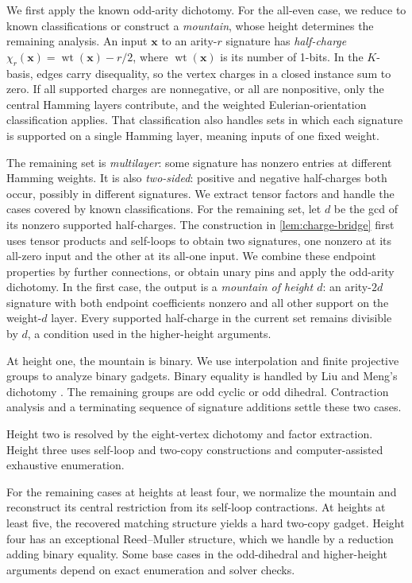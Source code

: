 \documentclass[11pt,letterpaper,onecolumn]{article}
\theoremstyle{plain}
\theoremstyle{definition}
\theoremstyle{remark}
\newcommand{\wt}{\operatorname{wt}}
\begin{document}
We first apply the known odd-arity dichotomy.  For the all-even case,
we reduce to known classifications or construct a \emph{mountain}, whose
height determines the remaining analysis.
An input \({\mathbf x}\) to an arity-\(r\) signature has \emph{half-charge}
\(\chi_r({\mathbf x})=\wt({\mathbf x})-r/2\), where \(\wt({\mathbf x})\) is its number of 1-bits.
In the \(K\)-basis, edges carry disequality, so the vertex charges in a
closed instance sum to zero.  If all supported charges are nonnegative,
or all are nonpositive, only the central Hamming layers contribute, and
the weighted Eulerian-orientation classification applies.  That
classification also handles sets in which each signature is supported on
a single Hamming layer, meaning inputs of one fixed weight.

The remaining set is \emph{multilayer}: some signature has nonzero entries at
different Hamming weights.  It is also \emph{two-sided}: positive and
negative half-charges both occur, possibly in different signatures.
We extract tensor factors and handle the cases covered by known
classifications.  For the remaining set, let \(d\) be the gcd of its
nonzero supported half-charges.  The construction in \cref{lem:charge-bridge}
first uses tensor
products and self-loops to obtain two signatures, one nonzero at its
all-zero input and the other at its all-one input.  We combine these
endpoint properties by further connections, or obtain unary pins and
apply the odd-arity dichotomy.  In the first case, the output is a
\emph{mountain of height \(d\)}: an arity-\(2d\) signature with both
endpoint coefficients nonzero and all other support on the weight-\(d\)
layer.  Every supported half-charge in the current set remains divisible
by \(d\), a condition used in the higher-height arguments.

At height one, the mountain is binary.  We use interpolation and finite
projective groups to analyze binary gadgets.  Binary equality is handled
by Liu and Meng's dichotomy \cite[Theorem~1.2]{Liu2026DEQ2Holant}.
The remaining groups are odd cyclic or odd dihedral.  Contraction analysis
and a terminating sequence of signature additions settle these two cases.

Height two is resolved by the eight-vertex dichotomy and factor extraction.
Height three uses self-loop and two-copy constructions and computer-assisted
exhaustive enumeration.

For the remaining cases at heights at least four, we normalize the
mountain and reconstruct its central restriction from its self-loop
contractions.  At heights at least five, the recovered matching structure
yields a hard two-copy gadget.  Height four has an exceptional
Reed--Muller structure, which we handle by a reduction adding binary
equality.  Some base cases in the odd-dihedral and higher-height arguments
depend on exact enumeration and solver checks.
\end{document}

